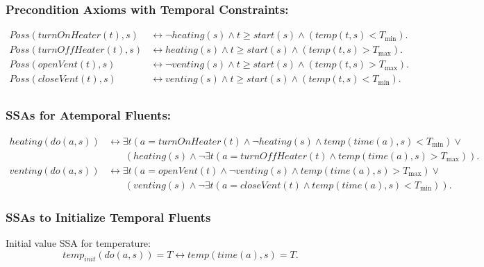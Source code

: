 \documentclass{assignment}
\begin{document}
\begin{problem}
\subsubsection*{Precondition Axioms with Temporal Constraints:}
\begin{align*}
Poss(turnOnHeater(t), s) & \leftrightarrow \neg heating(s) \land t \geq start(s) \land (temp(t, s) < T_{\text{min}}). \\
Poss(turnOffHeater(t), s) & \leftrightarrow heating(s) \land t \geq start(s) \land (temp(t, s) > T_{\text{max}}). \\
Poss(openVent(t), s) & \leftrightarrow \neg venting(s) \land t \geq start(s) \land (temp(t, s) > T_{\text{max}}). \\
Poss(closeVent(t), s) & \leftrightarrow venting(s) \land t \geq start(s) \land (temp(t, s) < T_{\text{min}}). \\
\end{align*}

\subsubsection*{SSAs for Atemporal Fluents:}
\begin{align*}
heating(do(a, s)) & \leftrightarrow \exists t (a = turnOnHeater(t) \land \neg heating(s) \land temp(time(a), s) < T_{\text{min}}) \lor \\
                   & \phantom{\leftrightarrow \ } (heating(s) \land \neg \exists t (a = turnOffHeater(t) \land temp(time(a), s) > T_{\text{max}})).\\
venting(do(a, s)) & \leftrightarrow \exists t (a = openVent(t) \land \neg venting(s) \land temp(time(a), s) > T_{\text{max}}) \lor \\
                   & \phantom{\leftrightarrow \ } (venting(s) \land \neg \exists t (a = closeVent(t) \land temp(time(a), s) < T_{\text{min}})).                   
\end{align*}

\subsubsection*{SSAs to Initialize Temporal Fluents}
Initial value SSA for temperature:
\[
temp_{init}(do(a, s)) = T \leftrightarrow temp(time(a), s) = T.
\]


\end{problem}
\end{document}

